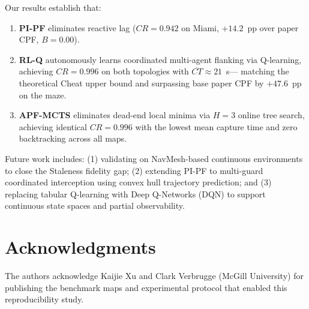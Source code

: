 \documentclass[conference,onecolumn]{IEEEtran}
\begin{document}
Our results establish that:
\begin{enumerate}
  \item \textbf{PI-PF} eliminates reactive lag ($CR = 0.942$ on
        Miami, $+14.2$~pp over paper CPF, $B = 0.00$).
  \item \textbf{RL-Q} autonomously learns coordinated
        multi-agent flanking via Q-learning, achieving $CR = 0.996$
        on both topologies with $\overline{CT} \approx 21$~s---
        matching the theoretical Cheat upper bound and surpassing
        base paper CPF by $+47.6$~pp on the maze.
  \item \textbf{APF-MCTS} eliminates dead-end local minima via
        $H{=}3$ online tree search, achieving identical $CR = 0.996$
        with the lowest mean capture time and zero backtracking
        across all maps.
\end{enumerate}

Future work includes: (1) validating on NavMesh-based continuous
environments to close the Staleness fidelity gap; (2) extending
PI-PF to multi-guard coordinated interception using convex hull
trajectory prediction; and (3) replacing tabular Q-learning with
Deep Q-Networks (DQN) to support continuous state spaces and
partial observability.

\section*{Acknowledgments}
The authors acknowledge Kaijie Xu and Clark Verbrugge
(McGill University) for publishing the benchmark maps and
experimental protocol that enabled this reproducibility study.
\end{document}
